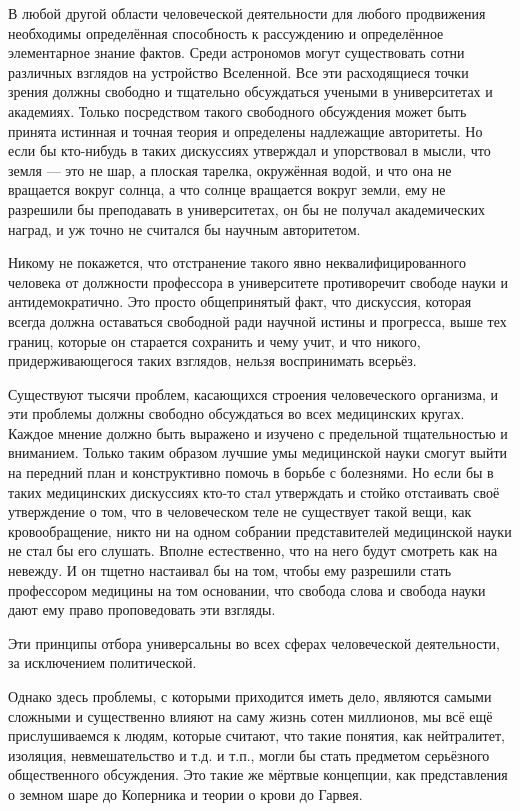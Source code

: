 В любой другой области человеческой деятельности для любого продвижения необходимы определённая способность к рассуждению и определённое элементарное знание фактов. Среди астрономов могут существовать сотни различных взглядов на устройство Вселенной. Все эти расходящиеся точки зрения должны свободно и тщательно обсуждаться учеными в университетах и академиях. Только посредством такого свободного обсуждения может быть принята истинная и точная теория и определены надлежащие авторитеты. Но если бы кто-нибудь в таких дискуссиях утверждал и упорствовал в мысли, что земля — это не шар, а плоская тарелка, окружённая водой, и что она не вращается вокруг солнца, а что солнце вращается вокруг земли, ему не разрешили бы преподавать в университетах, он бы не получал академических наград, и уж точно не считался бы научным авторитетом.
 
Никому не покажется, что отстранение такого явно неквалифицированного человека от должности профессора в университете противоречит свободе науки и антидемократично. Это просто общепринятый факт, что дискуссия, которая всегда должна оставаться свободной ради научной истины и прогресса, выше тех границ, которые он старается сохранить и чему учит, и что никого, придерживающегося таких взглядов, нельзя воспринимать всерьёз.

Существуют тысячи проблем, касающихся строения человеческого организма, и эти проблемы должны свободно обсуждаться во всех медицинских кругах. Каждое мнение должно быть выражено и изучено с предельной тщательностью и вниманием. Только таким образом лучшие умы медицинской науки смогут выйти на передний план и конструктивно помочь в борьбе с болезнями. Но если бы в таких медицинских дискуссиях кто-то стал утверждать и стойко отстаивать своё утверждение о том, что в человеческом теле не существует такой вещи, как кровообращение, никто ни на одном собрании представителей медицинской науки не стал бы его слушать. Вполне естественно, что на него будут смотреть как на невежду. И он тщетно настаивал бы на том, чтобы ему разрешили стать профессором медицины на том основании, что свобода слова и свобода науки дают ему право проповедовать эти взгляды.
 
Эти принципы отбора универсальны во всех сферах человеческой деятельности, за исключением политической.

Однако здесь проблемы, с которыми приходится иметь дело, являются самыми сложными и существенно влияют на саму жизнь сотен миллионов, мы всё ещё прислушиваемся к людям, которые считают, что такие понятия, как нейтралитет, изоляция, невмешательство и т.д. и т.п., могли бы стать предметом серьёзного общественного обсуждения. Это такие же мёртвые концепции, как представления о земном шаре до Коперника и теории о крови до Гарвея.
 
